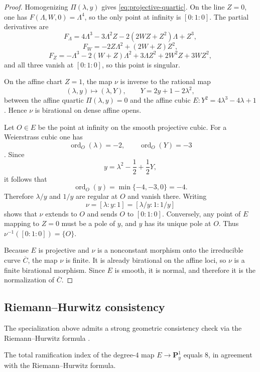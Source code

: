 \begin{proof}
Homogenizing \(\Pi(\lambda,y)\) gives \eqref{eq:projective-quartic}.
On the line \(Z=0\), one has \(F(\Lambda,W,0)=\Lambda^4\), so the only point at infinity is \([0:1:0]\).
The partial derivatives are
\[
F_\Lambda=4\Lambda^3-3\Lambda^2Z-2(2WZ+Z^2)\Lambda+Z^3,
\]
\[
F_W=-2Z\Lambda^2+(2W+Z)Z^2,
\]
\[
F_Z=-\Lambda^3-2(W+Z)\Lambda^2+3\Lambda Z^2+2W^2Z+3WZ^2,
\]
and all three vanish at \([0:1:0]\), so this point is singular.

On the affine chart \(Z=1\), the map \(\nu\) is inverse to the rational map
\[
(\lambda,y)\longmapsto (\lambda,Y),\qquad Y=2y+1-2\lambda^2,
\]
between the affine quartic \(\Pi(\lambda,y)=0\) and the affine cubic \(E:Y^2=4\lambda^3-4\lambda+1\).
Hence \(\nu\) is birational on dense affine opens.

Let \(O\in E\) be the point at infinity on the smooth projective cubic.
For a Weierstrass cubic one has
\[
\operatorname{ord}_O(\lambda)=-2,
\qquad
\operatorname{ord}_O(Y)=-3
\]
\cite{Silverman2009,Miranda1995}.
Since
\[
y=\lambda^2-\frac12+\frac12Y,
\]
it follows that
\[
\operatorname{ord}_O(y)=\min\{-4,-3,0\}=-4.
\]
Therefore \(\lambda/y\) and \(1/y\) are regular at \(O\) and vanish there.
Writing
\[
\nu=[\lambda:y:1]=[\lambda/y:1:1/y]
\]
shows that \(\nu\) extends to \(O\) and sends \(O\) to \([0:1:0]\).
Conversely, any point of \(E\) mapping to \(Z=0\) must be a pole of \(y\), and \(y\) has its unique pole at \(O\).
Thus \(\nu^{-1}([0:1:0])=\{O\}\).

Because \(E\) is projective and \(\nu\) is a nonconstant morphism onto the irreducible curve \(\overline C\), the map \(\nu\) is finite.
It is already birational on the affine loci, so \(\nu\) is a finite birational morphism.
Since \(E\) is smooth, it is normal, and therefore it is the normalization of \(\overline C\).
\end{proof}

\subsection{Riemann--Hurwitz consistency}\label{subsec:riemann-hurwitz}

The specialization above admits a strong geometric consistency check via the Riemann--Hurwitz formula \cite{Miranda1995}.

\begin{corollary}\label{cor:riemann-hurwitz}
The total ramification index of the degree-\(4\) map \(E \to \mathbf{P}^1_y\) equals \(8\), in agreement with the Riemann--Hurwitz formula.
\end{corollary}

